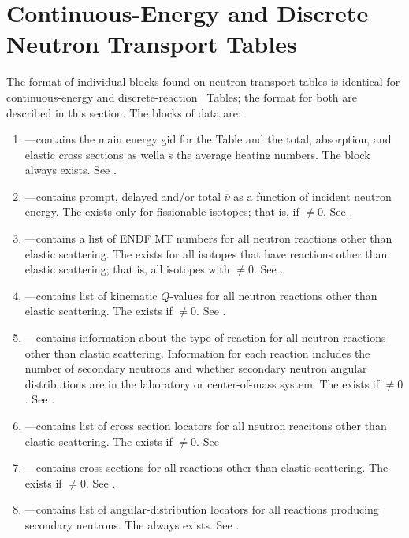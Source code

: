 \section{Continuous-Energy and Discrete Neutron Transport Tables}\label{sec:ContinuousEnergyNeutron}
The format of individual blocks found on neutron transport tables is identical for continuous-energy and discrete-reaction \ACE\ Tables; the format for both are described in this section. The blocks of data are:
\begin{enumerate}
  \item {}---contains the main energy gid for the Table and the total, absorption, and elastic cross sections as wella s the average heating numbers. The  block always exists. See .
  \item {}---contains prompt, delayed and/or total $\overline{\nu}$ as a function of incident neutron energy. The  exists only for fissionable isotopes; that is, if $\neq0$. See .
  \item {}---contains a list of ENDF MT numbers for all neutron reactions other than elastic scattering. The  exists for all isotopes that have reactions other than elastic scattering; that is, all isotopes with $\neq0$. See .
  \item {}---contains list of kinematic $Q$-values for all neutron reactions other than elastic scattering. The  exists if $\neq0$. See .
  \item {}---contains information about the type of reaction for all neutron reactions other than elastic scattering. Information for each reaction includes the number of secondary neutrons and whether secondary neutron angular distributions are in the laboratory or center-of-mass system. The  exists if $\neq0$. See .
  \item {}---contains list of cross section locators for all neutron reacitons other than elastic scattering. The  exists if $\neq0$. See 
  \item {}---contains cross sections for all reactions other than elastic scattering. The  exists if $\neq0$. See .
  \item {}---contains list of angular-distribution locators for all reactions producing secondary neutrons. The  always exists. See .

\end{enumerate}
